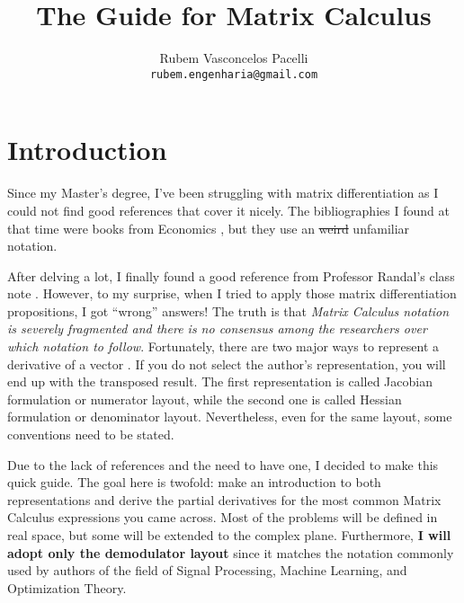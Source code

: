 \documentclass{article}
\title{\textbf{The Guide for Matrix Calculus}  \vspace{-.3cm}}
\author{Rubem Vasconcelos Pacelli\\
  {\tt rubem.engenharia@gmail.com}}
\affil{Department of Teleinformatics Engineering, Federal University of Ceará.\\Fortaleza, Ceará, Brazil. \vspace{-.5cm}}
\begin{document}
\maketitle
\tableofcontents
\newpage
\section{Introduction}
Since my Master's degree, I've been struggling with matrix differentiation as I could not find good references that cover it nicely. The bibliographies I found at that time were books from Economics \cite{dhrymes1978mathematics}, but they use an \st{weird} unfamiliar notation.

After delving a lot, I finally found a good reference from Professor Randal's class note \cite{barnes2006matrix}. However, to my surprise, when I tried to apply those matrix differentiation propositions, I got ``wrong'' answers! The truth is that \emph{Matrix Calculus notation is severely fragmented and there is no consensus among the researchers over which notation to follow}. Fortunately, there are two major ways to represent a derivative of a vector \cite{Singh}. If you do not select the author's representation, you will end up with the transposed result. The first representation is called Jacobian formulation or numerator layout, while the second one is called Hessian formulation or denominator layout. Nevertheless, even for the same layout, some conventions need to be stated.

Due to the lack of references and the need to have one, I decided to make this quick guide. The goal here is twofold: make an introduction to both representations and derive the partial derivatives for the most common Matrix Calculus expressions you came across. Most of the problems will be defined in real space, but some will be extended to the complex plane. Furthermore, \textbf{I will adopt only the demodulator layout} since it matches the notation commonly used by authors of the field of Signal Processing, Machine Learning, and Optimization Theory.
\end{document}
